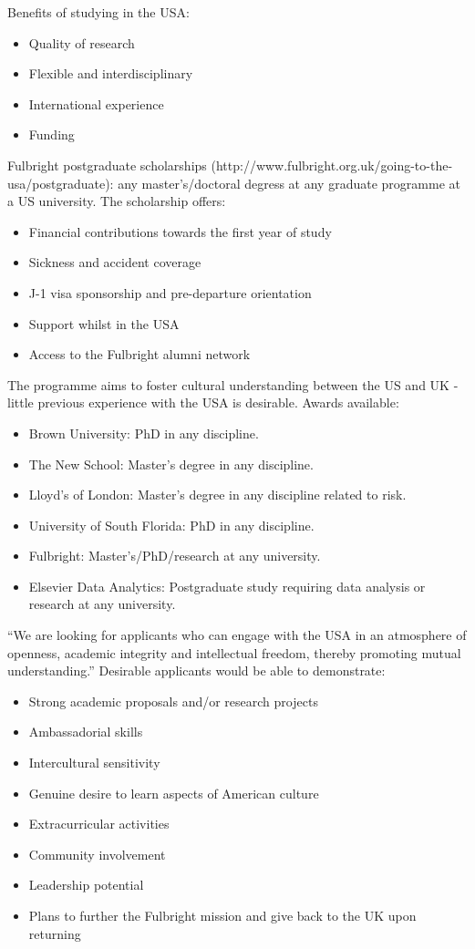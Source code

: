 \documentclass[idxtotoc,hyperref,openany]{labbook} %
\begin{document}
 Benefits of studying in the USA:
 \begin{itemize}
 	\item Quality of research
 	\item Flexible and interdisciplinary
 	\item International experience
 	\item Funding
 \end{itemize}
 
Fulbright postgraduate scholarships (http://www.fulbright.org.uk/going-to-the-usa/postgraduate): any master's/doctoral degress at any graduate programme at a US university. The scholarship offers:
\begin{itemize}
	\item Financial contributions towards the first year of study
	\item Sickness and accident coverage
	\item J-1 visa sponsorship and pre-departure orientation
	\item Support whilst in the USA
	\item Access to the Fulbright alumni network
\end{itemize}
  The programme aims to foster cultural understanding between the US and UK - little previous experience with the USA is desirable.
Awards available:
\begin{itemize}
	\item Brown University: PhD in any discipline.
	\item The New School: Master's degree in any discipline.
	\item Lloyd's of London: Master's degree in any discipline related to risk.
	\item University of South Florida: PhD in any discipline.
	\item Fulbright: Master's/PhD/research at any university.
	\item Elsevier Data Analytics: Postgraduate study requiring data analysis or research at any university.
\end{itemize}
  ``We are looking for applicants who can engage with the USA in an atmosphere of openness, academic integrity and intellectual freedom, thereby promoting mutual understanding.''
Desirable applicants would be able to demonstrate:
\begin{itemize}
	\item Strong academic proposals and/or research projects
	\item Ambassadorial skills
	\item Intercultural sensitivity
	\item Genuine desire to learn aspects of American culture
	\item Extracurricular activities
	\item Community involvement
	\item Leadership potential
	\item Plans to further the Fulbright mission and give back to the UK upon returning
\end{itemize}
\end{document}

